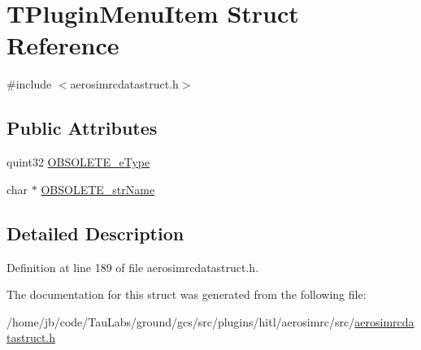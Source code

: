 \hypertarget{struct_t_plugin_menu_item}{\section{\-T\-Plugin\-Menu\-Item \-Struct \-Reference}
\label{struct_t_plugin_menu_item}
}


{\ttfamily \#include $<$aerosimrcdatastruct.\-h$>$}

\subsection*{\-Public \-Attributes}
\begin{DoxyCompactItemize}
\item 
quint32 \hyperlink{group___aero_sim_r_c_ga3182cdcc989c86e02f89dfc950a2d11e}{\-O\-B\-S\-O\-L\-E\-T\-E\-\_\-e\-Type}
\item 
char $\ast$ \hyperlink{group___aero_sim_r_c_ga99ed050ca0dfe8088a93046f72c044e7}{\-O\-B\-S\-O\-L\-E\-T\-E\-\_\-str\-Name}
\end{DoxyCompactItemize}


\subsection{\-Detailed \-Description}


\-Definition at line 189 of file aerosimrcdatastruct.\-h.



\-The documentation for this struct was generated from the following file\-:\begin{DoxyCompactItemize}
\item 
/home/jb/code/\-Tau\-Labs/ground/gcs/src/plugins/hitl/aerosimrc/src/\hyperlink{aerosimrcdatastruct_8h}{aerosimrcdatastruct.\-h}\end{DoxyCompactItemize}
